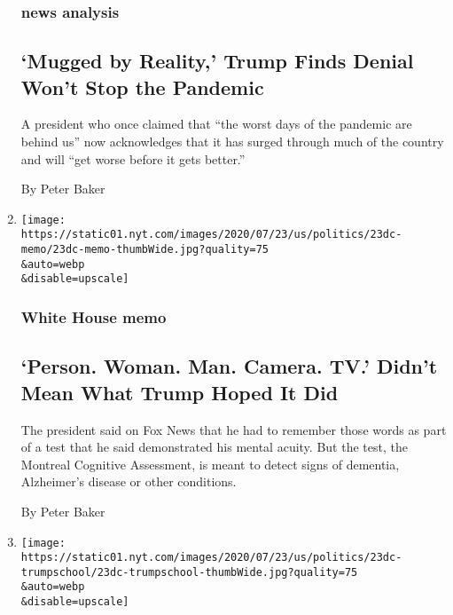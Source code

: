 \begin{enumerate}
  \hypertarget{news-analysis-2}{%
  \subsubsection{news analysis}\label{news-analysis-2}}

  \hypertarget{mugged-by-reality-trump-finds-denial-wont-stop-the-pandemic}{%
  \subsection{`Mugged by Reality,' Trump Finds Denial Won't Stop the
  Pandemic}\label{mugged-by-reality-trump-finds-denial-wont-stop-the-pandemic}}

  A president who once claimed that ``the worst days of the pandemic are
  behind us'' now acknowledges that it has surged through much of the
  country and will ``get worse before it gets better.''

  By Peter Baker
\item
  \href{/2020/07/23/us/politics/person-woman-man-camera-tv-trump.html}{}

  \texttt{[image: https://static01.nyt.com/images/2020/07/23/us/politics/23dc-memo/23dc-memo-thumbWide.jpg?quality=75\\\&auto=webp\\\&disable=upscale]}

  \hypertarget{white-house-memo}{%
  \subsubsection{White House memo}\label{white-house-memo}}

  \hypertarget{person-woman-man-camera-tv-didnt-mean-what-trump-hoped-it-did}{%
  \subsection{`Person. Woman. Man. Camera. TV.' Didn't Mean What Trump
  Hoped It
  Did}\label{person-woman-man-camera-tv-didnt-mean-what-trump-hoped-it-did}}

  The president said on Fox News that he had to remember those words as
  part of a test that he said demonstrated his mental acuity. But the
  test, the Montreal Cognitive Assessment, is meant to detect signs of
  dementia, Alzheimer's disease or other conditions.

  By Peter Baker
\item
  \href{/2020/07/23/us/politics/barron-trump-school-coronavirus.html}{}

  \texttt{[image: https://static01.nyt.com/images/2020/07/23/us/politics/23dc-trumpschool/23dc-trumpschool-thumbWide.jpg?quality=75\\\&auto=webp\\\&disable=upscale]}


\end{enumerate}
